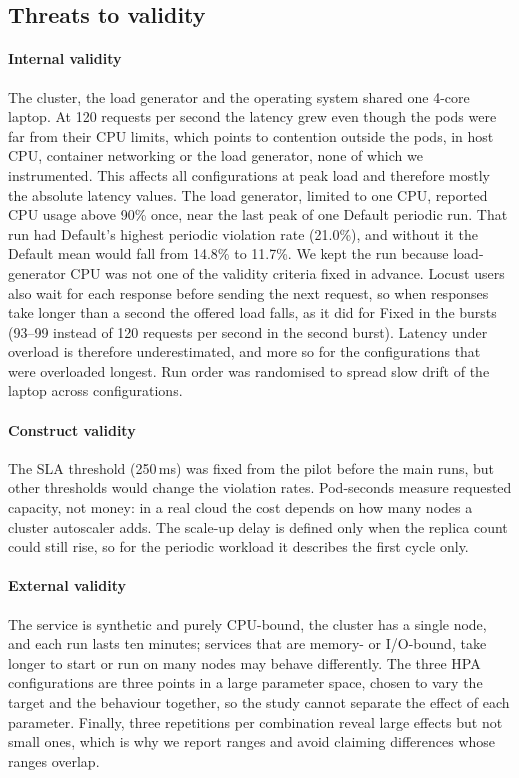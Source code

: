\documentclass[conference,a4paper]{IEEEtran}
\begin{document}
\subsection{Threats to validity}
\label{sec:threats}

\paragraph{Internal validity}
The cluster, the load generator and the operating system shared one 4-core
laptop. At 120 requests per second the latency grew even though the pods were
far from their CPU limits, which points to contention outside the pods, in
host CPU, container networking or the load generator, none of which we
instrumented. This affects all configurations at peak load and therefore
mostly the absolute latency values. The load generator, limited to one CPU,
reported CPU usage above 90\% once, near the last peak of one Default periodic
run. That run had Default's highest periodic violation rate (21.0\%), and
without it the Default mean would fall from 14.8\% to 11.7\%. We kept the run
because load-generator CPU was not one of the validity criteria fixed in
advance. Locust users also wait for each response before sending the next
request, so when responses take longer than a second the offered load falls,
as it did for Fixed in the bursts (93--99 instead of 120 requests per
second in the second burst). Latency under overload is therefore
underestimated, and more so for the configurations that were overloaded
longest. Run order was randomised to spread slow drift of the laptop across
configurations.

\paragraph{Construct validity}
The SLA threshold (250\,ms) was fixed from the pilot before the main runs, but
other thresholds would change the violation rates. Pod-seconds measure
requested capacity, not money: in a real cloud the cost depends on how many
nodes a cluster autoscaler adds. The scale-up delay is defined only when the
replica count could still rise, so for the periodic workload it describes the
first cycle only.

\paragraph{External validity}
The service is synthetic and purely CPU-bound, the cluster has a single node,
and each run lasts ten minutes; services that are memory- or I/O-bound, take
longer to start or run on many nodes may behave differently. The three HPA
configurations are three points in a large parameter space, chosen to vary
the target and the behaviour together, so the study cannot separate the effect
of each parameter. Finally, three repetitions per combination reveal large
effects but not small ones, which is why we report ranges and avoid claiming
differences whose ranges overlap.
\end{document}
